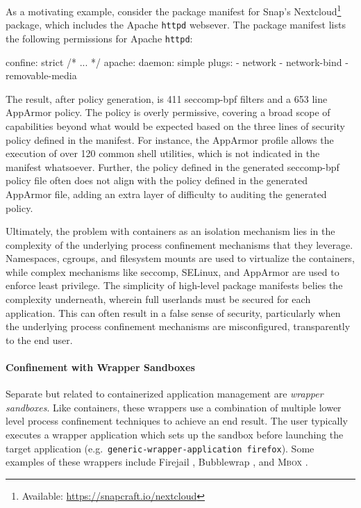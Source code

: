 \documentclass[dvipsnames, 12pt]{article}
\newcommand{\kimmbox}{\textsc{Mbox}}
\begin{document}
As a motivating example, consider the package manifest for Snap's
Nextcloud\footnote{Available: \url{https://snapcraft.io/nextcloud}} package, which includes
the Apache \texttt{httpd} websever. The package manifest lists the following
permissions for Apache \texttt{httpd}:

\begin{listing}[language=yaml]
confine: strict
/* ... */
apache:
  daemon: simple
  plugs:
  - network
  - network-bind
  - removable-media
\end{listing}

The result, after policy generation, is 411 seccomp-bpf filters and a 653 line
AppArmor policy. The policy is overly permissive, covering a broad scope of
capabilities beyond what would be expected based on the three lines of security
policy defined in the manifest. For instance, the AppArmor profile allows the
execution of over 120 common shell utilities, which is not indicated in the
manifest whatsoever. Further, the policy defined in the generated seccomp-bpf
policy file often does not align with the policy defined in the generated
AppArmor file, adding an extra layer of difficulty to auditing the generated
policy.

Ultimately, the problem with containers as an isolation mechanism lies in the
complexity of the underlying process confinement mechanisms that they leverage.
Namespaces, cgroups, and filesystem mounts are used to virtualize the
containers, while complex mechanisms like seccomp, SELinux, and AppArmor are
used to enforce least privilege. The simplicity of high-level package manifests
belies the complexity underneath, wherein full userlands must be secured for
each application. This can often result in a false sense of security,
particularly when the underlying process confinement mechanisms are
misconfigured, transparently to the end user.

\paragraph*{Confinement with Wrapper Sandboxes}

Separate but related to containerized application management are \textit{wrapper
sandboxes}. Like containers, these wrappers use a combination of multiple lower
level process confinement techniques to achieve an end result.  The user
typically executes a wrapper application which sets up the sandbox before
launching the target application (e.g.~\texttt{generic-wrapper-application
firefox}).  Some examples of these wrappers include Firejail \cite{firejail},
Bubblewrap \cite{bubblewrap}, and \kimmbox{} \cite{kim2013_mbox}.
\end{document}
